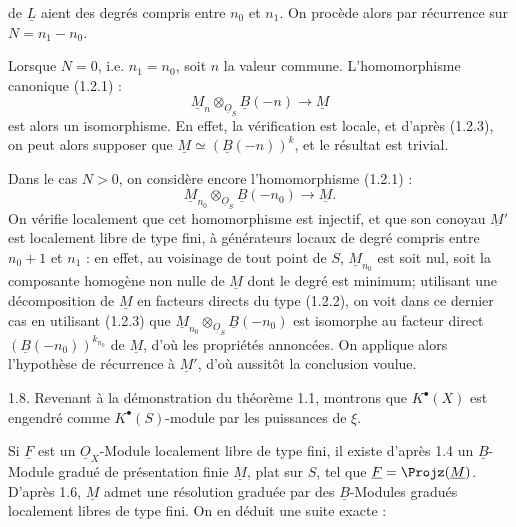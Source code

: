 
de \(\underline{L}\)
aient des degrés compris entre \(n_0\) et \(n_1\). On procède alors par récurrence sur \(N=n_1-n_0\).

Lorsque \(N=0\), i.e. \(n_1=n_0\), soit \(n\) la valeur commune. L'homomorphisme canonique (1.2.1) :
\[
  \underline{M}_n\otimes_{\underline{O}_S}\underline{B}(-n)\longrightarrow \underline{M}
\]
est alors un isomorphisme. En effet, la vérification est locale, et d'après (1.2.3), on peut alors supposer que \(\underline{M}\simeq(\underline{B}(-n))^k\), et le résultat est trivial.

Dans le cas \(N>0\), on considère encore l'homomorphisme (1.2.1) :
\[
  \underline{M}_{n_0}\otimes_{\underline{O}_S}\underline{B}(-n_0)\longrightarrow \underline{M}.
\]
On vérifie localement que cet homomorphisme est injectif, et que son conoyau \(\underline{M}'\) est localement libre de type fini, à générateurs locaux de degré compris entre \(n_0+1\) et \(n_1\) : en effet, au voisinage de tout point de \(S\), \(\underline{M}_{n_0}\) est soit nul, soit la composante homogène non nulle de \(\underline{M}\) dont le degré est minimum; utilisant une décomposition de \(\underline{M}\) en facteurs directs du type (1.2.2), on voit dans ce dernier cas en utilisant (1.2.3) que \(\underline{M}_{n_0}\otimes_{\underline{O}_S}\underline{B}(-n_0)\) est isomorphe au facteur direct \((\underline{B}(-n_0))^{k_{n_0}}\) de \(\underline{M}\), d'où les propriétés annoncées. On applique alors l'hypothèse de récurrence à \(\underline{M}'\), d'où aussitôt la conclusion voulue.

1.8. Revenant à la démonstration du théorème 1.1, montrons que \(K^{\bullet}(X)\) est engendré comme \(K^{\bullet}(S)\)-module par les puissances de \(\xi\).

Si \(\underline{F}\) est un \(\underline{O}_X\)-Module localement libre de type fini, il existe d'après 1.4 un \(\underline{B}\)-Module gradué de présentation finie \(\underline{M}\), plat sur \(S\), tel que \(\underline{F}=\Projz(\underline{M})\). D'après 1.6, \(\underline{M}\) admet une résolution graduée par des \(\underline{B}\)-Modules gradués localement libres de type fini. On en déduit une
suite exacte :
